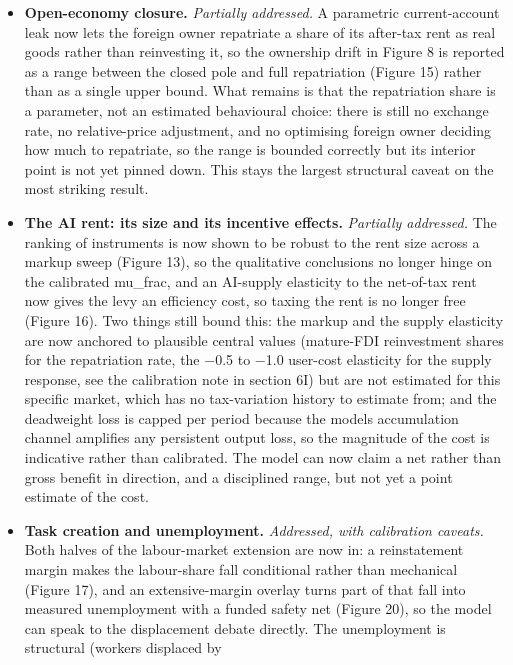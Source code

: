 \documentclass[12pt]{article}
\providecommand{\tightlist}{\setlength{\itemsep}{0pt}\setlength{\parskip}{0pt}}
\begin{document}
\begin{itemize}
\tightlist
\item
  \textbf{Open-economy closure.} \emph{Partially addressed.} A
  parametric current-account leak now lets the foreign owner repatriate
  a share of its after-tax rent as real goods rather than reinvesting
  it, so the ownership drift in Figure 8 is reported as a range between
  the closed pole and full repatriation (Figure 15) rather than as a
  single upper bound. What remains is that the repatriation share is a
  parameter, not an estimated behavioural choice: there is still no
  exchange rate, no relative-price adjustment, and no optimising foreign
  owner deciding how much to repatriate, so the range is bounded
  correctly but its interior point is not yet pinned down. This stays
  the largest structural caveat on the most striking result.
\item
  \textbf{The AI rent: its size and its incentive effects.}
  \emph{Partially addressed.} The ranking of instruments is now shown to
  be robust to the rent size across a markup sweep (Figure 13), so the
  qualitative conclusions no longer hinge on the calibrated mu\_frac,
  and an AI-supply elasticity to the net-of-tax rent now gives the levy
  an efficiency cost, so taxing the rent is no longer free (Figure 16).
  Two things still bound this: the markup and the supply elasticity are
  now anchored to plausible central values (mature-FDI reinvestment
  shares for the repatriation rate, the $-$0.5 to $-$1.0 user-cost
  elasticity for the supply response, see the calibration note in
  section 6I) but are not estimated for this specific market, which has
  no tax-variation history to estimate from; and the deadweight loss is
  capped per period because the model\textquotesingle s accumulation
  channel amplifies any persistent output loss, so the magnitude of the
  cost is indicative rather than calibrated. The model can now claim a
  net rather than gross benefit in direction, and a disciplined range,
  but not yet a point estimate of the cost.
\item
  \textbf{Task creation and unemployment.} \emph{Addressed, with
  calibration caveats.} Both halves of the labour-market extension are
  now in: a reinstatement margin makes the labour-share fall conditional
  rather than mechanical (Figure 17), and an extensive-margin overlay
  turns part of that fall into measured unemployment with a funded
  safety net (Figure 20), so the model can speak to the displacement
  debate directly. The unemployment is structural (workers displaced by

\end{itemize}
\end{document}
